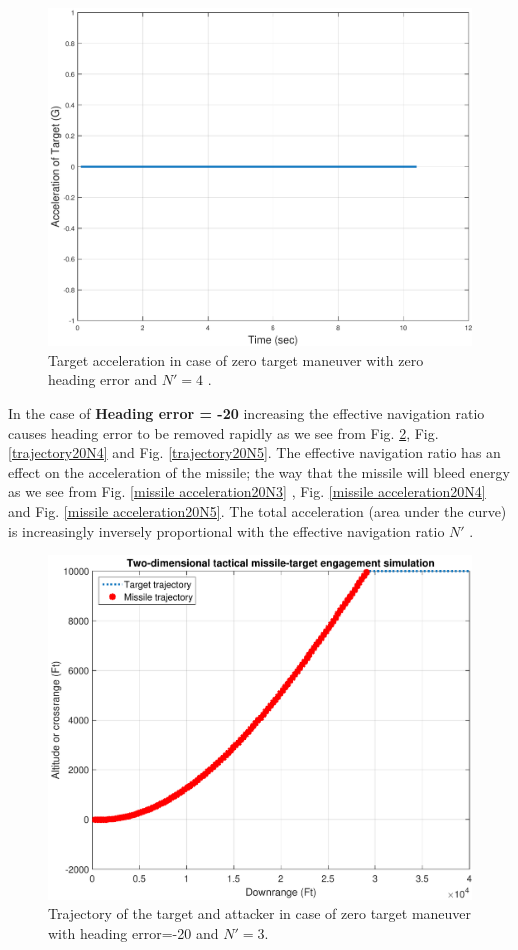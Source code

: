 \begin{figure}[H]
	\centering
	\includegraphics[scale = 0.58]{fig/TargetAccelerationXNT0HE0N4.pdf}
	\caption{Target acceleration in case of zero target maneuver with zero heading error and $N'=4$ .}
	\label{Target accelerationXNT0HE0N4}
\end{figure}


In the case of \textbf{Heading error = -20} increasing the effective navigation ratio causes heading error to be removed rapidly as we see from  Fig. \ref{trajectory20N3}, Fig. \ref{trajectory20N4} and Fig. \ref{trajectory20N5}. The effective navigation ratio has an effect on the acceleration of the missile; the way that the missile will bleed energy as we see from Fig. \ref{missile acceleration20N3} , Fig. \ref{missile acceleration20N4} and Fig. \ref{missile acceleration20N5}. The total acceleration (area under the curve) is increasingly inversely proportional with the effective navigation ratio $N'$ .


\begin{figure}[H]
	\centering
	\includegraphics[scale = 0.48]{fig/trajectoryXNT0HE20N3.pdf}
	\caption{Trajectory of the target and attacker in case of zero target maneuver with heading error=-20 and $N'=3$.}
	\label{trajectory20N3}
\end{figure}

